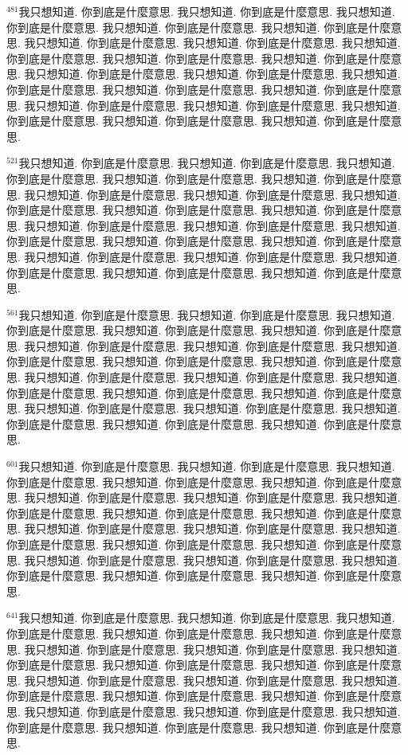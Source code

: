 \documentclass{book}
\begin{document}
$^{481}$我只想知道.
你到底是什麼意思.
我只想知道.
你到底是什麼意思.
我只想知道.
你到底是什麼意思.
我只想知道.
你到底是什麼意思.
我只想知道.
你到底是什麼意思.
我只想知道.
你到底是什麼意思.
我只想知道.
你到底是什麼意思.
我只想知道.
你到底是什麼意思.
我只想知道.
你到底是什麼意思.
我只想知道.
你到底是什麼意思.
我只想知道.
你到底是什麼意思.
我只想知道.
你到底是什麼意思.
我只想知道.
你到底是什麼意思.
我只想知道.
你到底是什麼意思.
我只想知道.
你到底是什麼意思.
我只想知道.
你到底是什麼意思.
我只想知道.
你到底是什麼意思.
我只想知道.
你到底是什麼意思.
我只想知道.
你到底是什麼意思.
我只想知道.
你到底是什麼意思.

$^{521}$我只想知道.
你到底是什麼意思.
我只想知道.
你到底是什麼意思.
我只想知道.
你到底是什麼意思.
我只想知道.
你到底是什麼意思.
我只想知道.
你到底是什麼意思.
我只想知道.
你到底是什麼意思.
我只想知道.
你到底是什麼意思.
我只想知道.
你到底是什麼意思.
我只想知道.
你到底是什麼意思.
我只想知道.
你到底是什麼意思.
我只想知道.
你到底是什麼意思.
我只想知道.
你到底是什麼意思.
我只想知道.
你到底是什麼意思.
我只想知道.
你到底是什麼意思.
我只想知道.
你到底是什麼意思.
我只想知道.
你到底是什麼意思.
我只想知道.
你到底是什麼意思.
我只想知道.
你到底是什麼意思.
我只想知道.
你到底是什麼意思.
我只想知道.
你到底是什麼意思.

$^{561}$我只想知道.
你到底是什麼意思.
我只想知道.
你到底是什麼意思.
我只想知道.
你到底是什麼意思.
我只想知道.
你到底是什麼意思.
我只想知道.
你到底是什麼意思.
我只想知道.
你到底是什麼意思.
我只想知道.
你到底是什麼意思.
我只想知道.
你到底是什麼意思.
我只想知道.
你到底是什麼意思.
我只想知道.
你到底是什麼意思.
我只想知道.
你到底是什麼意思.
我只想知道.
你到底是什麼意思.
我只想知道.
你到底是什麼意思.
我只想知道.
你到底是什麼意思.
我只想知道.
你到底是什麼意思.
我只想知道.
你到底是什麼意思.
我只想知道.
你到底是什麼意思.
我只想知道.
你到底是什麼意思.
我只想知道.
你到底是什麼意思.
我只想知道.
你到底是什麼意思.

$^{601}$我只想知道.
你到底是什麼意思.
我只想知道.
你到底是什麼意思.
我只想知道.
你到底是什麼意思.
我只想知道.
你到底是什麼意思.
我只想知道.
你到底是什麼意思.
我只想知道.
你到底是什麼意思.
我只想知道.
你到底是什麼意思.
我只想知道.
你到底是什麼意思.
我只想知道.
你到底是什麼意思.
我只想知道.
你到底是什麼意思.
我只想知道.
你到底是什麼意思.
我只想知道.
你到底是什麼意思.
我只想知道.
你到底是什麼意思.
我只想知道.
你到底是什麼意思.
我只想知道.
你到底是什麼意思.
我只想知道.
你到底是什麼意思.
我只想知道.
你到底是什麼意思.
我只想知道.
你到底是什麼意思.
我只想知道.
你到底是什麼意思.
我只想知道.
你到底是什麼意思.

$^{641}$我只想知道.
你到底是什麼意思.
我只想知道.
你到底是什麼意思.
我只想知道.
你到底是什麼意思.
我只想知道.
你到底是什麼意思.
我只想知道.
你到底是什麼意思.
我只想知道.
你到底是什麼意思.
我只想知道.
你到底是什麼意思.
我只想知道.
你到底是什麼意思.
我只想知道.
你到底是什麼意思.
我只想知道.
你到底是什麼意思.
我只想知道.
你到底是什麼意思.
我只想知道.
你到底是什麼意思.
我只想知道.
你到底是什麼意思.
我只想知道.
你到底是什麼意思.
我只想知道.
你到底是什麼意思.
我只想知道.
你到底是什麼意思.
我只想知道.
你到底是什麼意思.
我只想知道.
你到底是什麼意思.
我只想知道.
你到底是什麼意思.
我只想知道.
你到底是什麼意思.
\end{document}
